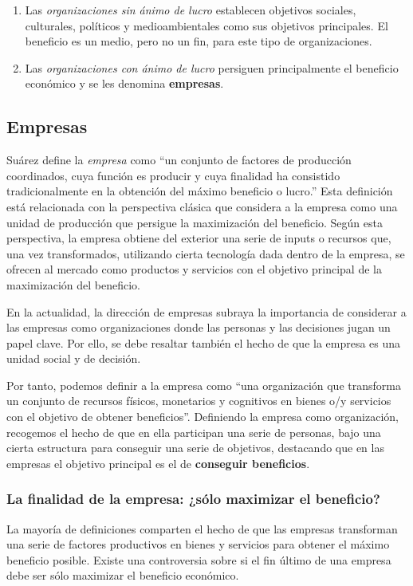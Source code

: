 \documentclass[12pt,a4paper,spanish]{report}
\begin{document}
			\begin{enumerate} [-]
				\item Las \textcolor[rgb]{0.5,0.8,0.9}{\emph{organizaciones sin ánimo de lucro}} establecen objetivos sociales, culturales, políticos y medioambientales como sus objetivos principales. El beneficio es un medio, pero no un fin, para este tipo de organizaciones.

				\item Las \textcolor[rgb]{0.5,0.8,0.9}{\emph{organizaciones con ánimo de lucro}} persiguen principalmente el beneficio económico y se les denomina \textbf{empresas}.
			\end{enumerate}

		\subsection{\textcolor[rgb]{0.5,0.8,0.9}Empresas}
			Suárez define la \textcolor[rgb]{0.5,0.8,0.9}{\emph{empresa}} como ``un conjunto de factores de producción coordinados, cuya función es producir y cuya finalidad ha consistido tradicionalmente en la obtención del máximo beneficio o lucro.'' Esta definición está relacionada con la perspectiva clásica que considera a la empresa como una unidad de producción que persigue la maximización del beneficio. Según esta perspectiva, la empresa obtiene del exterior una serie de inputs o recursos que, una vez transformados, utilizando cierta tecnología dada dentro de la empresa, se ofrecen al mercado como productos y servicios con el objetivo principal de la maximización del beneficio.

			En la actualidad, la dirección de empresas subraya la importancia de considerar a las empresas como organizaciones donde las personas y las decisiones jugan un papel clave. Por ello, se debe resaltar también el hecho de que la empresa es una unidad social y de decisión.

			Por tanto, podemos definir a la empresa como ``una organización que transforma un conjunto de recursos físicos, monetarios y cognitivos en bienes o/y servicios con el objetivo de obtener beneficios''. Definiendo la empresa como organización, recogemos el hecho de que en ella participan una serie de personas, bajo una cierta estructura para conseguir una serie de objetivos, destacando que en las empresas el objetivo principal es el de \textbf{conseguir beneficios}.

		\subsubsection*{\textcolor[rgb]{0.5,0.8,0.9}La finalidad de la empresa: ¿sólo maximizar el beneficio?}
			La mayoría de definiciones comparten el hecho de que las empresas transforman una serie de factores productivos en bienes y servicios para obtener el máximo beneficio posible. Existe una controversia sobre si el fin último de una empresa debe ser sólo maximizar el beneficio económico.
\end{document}

